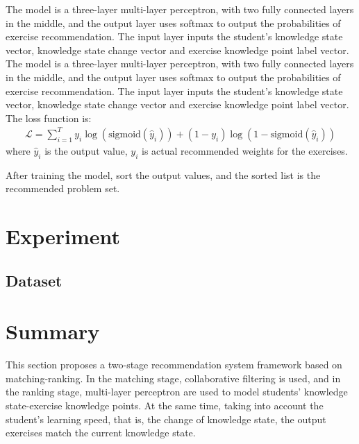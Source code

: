 The model is a three-layer multi-layer perceptron, with two fully connected layers in the middle, and the output layer uses softmax to output the probabilities of exercise recommendation. The input layer inputs the student's knowledge state vector, knowledge state change vector and exercise knowledge point label vector. The model is a three-layer multi-layer perceptron, with two fully connected layers in the middle, and the output layer uses softmax to output the probabilities of exercise recommendation. The input layer inputs the student's knowledge state vector, knowledge state change vector and exercise knowledge point label vector. The loss function is:
\begin{align}
  \mathcal{L}=\sum_{i=1}^{T} y_i \log (\text{sigmoid}(\hat{y}_i))+(1-y_i ) \log (1-\text{sigmoid}(\hat{y}_i))
\end{align}
where \(\hat{y}_i\) is the output value, \(y_i\) is actual recommended weights for the exercises.

After training the model, sort the output values, and the sorted list is the recommended problem set.


\section{Experiment}
\subsection{Dataset}

\section{Summary}
This section proposes a two-stage recommendation system framework based on matching-ranking. In the matching stage, collaborative filtering is used, and in the ranking stage, multi-layer perceptron are used to model students' knowledge state-exercise knowledge points. At the same time, taking into account the student's learning speed, that is, the change of knowledge state, the output exercises match the current knowledge state.